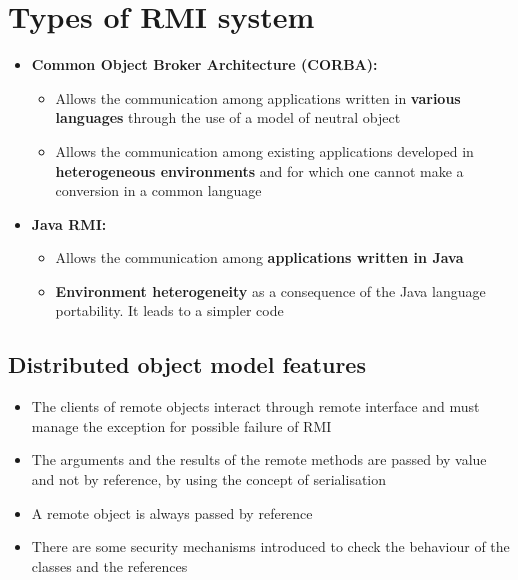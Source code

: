 \chapter{Types of RMI system}
\begin{itemize}
    \item \textbf{Common Object Broker Architecture (CORBA):}
        \begin{itemize}
            \item Allows the communication among applications written in \textbf{various languages} through the use of a model of neutral object
            \item Allows the communication among existing applications developed in \textbf{heterogeneous environments} and for which one cannot make a conversion in a common language
        \end{itemize}
    \item \textbf{Java RMI:}
        \begin{itemize}
            \item Allows the communication among \textbf{applications written in Java}
            \item \textbf{Environment heterogeneity} as a consequence of the Java language portability. It leads to a simpler code 
        \end{itemize}
\end{itemize}

\section{Distributed object model features}
\begin{itemize}
    \item The clients of remote objects interact through remote interface and must manage the exception for possible failure of RMI 
    \item The arguments and the results of the remote methods are passed by value and not by reference, by using the concept of serialisation
    \item A remote object is always passed by reference
    \item There are some security mechanisms introduced to check the behaviour of the classes and the references
\end{itemize}


